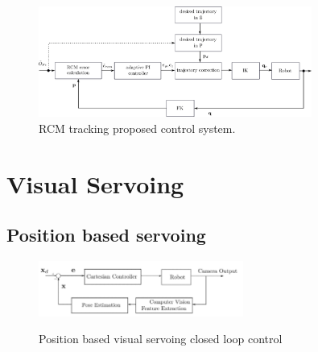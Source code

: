 \begin{center}
\begin{figure}[htbp]
\centering
\includegraphics[width=0.8\textwidth]{images/rcm-system-control.png}
\caption{RCM tracking proposed control system.}
\label{rcm-control-system-block-diagram}
\end{figure}
\end{center}

%
\section{Visual Servoing}
%
%
\subsection{Position based servoing}
\clearpage

\begin{center}
\begin{figure}[htbp]
\centering
\includegraphics[width=0.6\textwidth]{images/visual-servoing-position-based.png}\\
\caption{Position based visual servoing closed loop control}
\end{figure}
\end{center}

